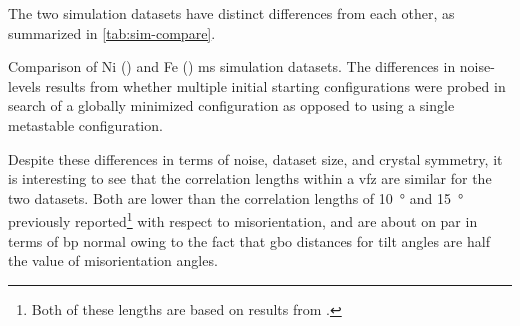 \documentclass[final,twocolumn,12pt]{elsarticle}
\begin{document}
	\begin{table}[]
	\centering
	\caption{Fitted parameters for two \gls{gpr} models fitted to the 388 simulated Ni \glspl{gbe} by \citet{olmstedSurveyComputedGrain2009a} and fitted parameters for a \gls{gpr} model trained on 80\% of the Fe simulation data (\num{46883} \glspl{gb}). The first Ni model allows $\sigma$ to vary, whereas the second constrains $\sigma$ to be fixed. Mat., $\sigma_L$, $\sigma_F$, $\beta$, and $\sigma$ are the material (i.e. element), kernel length scale in units of $d_{\Omega}$ ($^\circ{}$), signal standard deviation ($J m^{-2}$), constant basis function ($J m^{-2}$), and input property standard deviation ($J m^{-2}$), respectively. %
	}
	\label{tab:resubloss-ni-pars}
    \end{table}
    
	The two simulation datasets have distinct differences from each other, as summarized in \cref{tab:sim-compare}.
	\begin{table}[htb!]
	    \centering
	    \caption{Comparison of Ni (\citet{olmstedSurveyComputedGrain2009}) and Fe (\citet{kimPhasefieldModeling3D2014}) \gls{ms} simulation datasets. The differences in noise-levels results from whether multiple initial starting configurations were probed in search of a globally minimized configuration as opposed to using a single metastable configuration. }
\label{tab:sim-compare}
	\end{table}
	
	Despite these differences in terms of noise, dataset size, and crystal symmetry, it is interesting to see that the correlation lengths within a \gls{vfz} are similar for the two datasets. Both are lower than the correlation lengths of \SI{10}{\degree} \cite{rohrerComparingCalculatedMeasured2010} and \SI{15}{\degree} \cite{olmstedSurveyComputedGrain2009} previously reported\footnote{Both of these lengths are based on results from \citet{olmstedSurveyComputedGrain2009}.} with respect to misorientation, and are about on par in terms of \gls{bp} normal owing to the fact that \gls{gbo} distances for tilt angles are half the value of misorientation angles.
	
\end{document}
